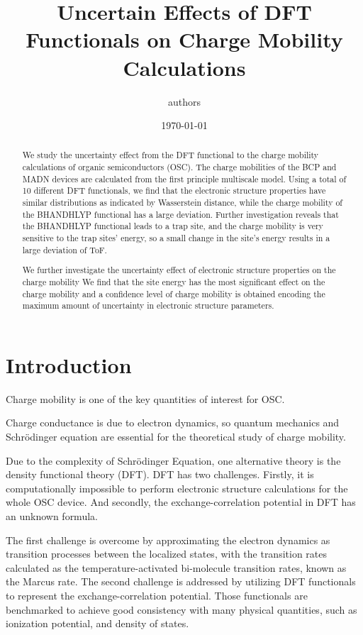\documentclass[letterpaper,12pt]{article}
\begin{document}
\title{Uncertain Effects of DFT Functionals on Charge Mobility Calculations}
\author{authors}
\date{\today}
\maketitle

\begin{abstract}
    We study the uncertainty effect from the DFT functional to the charge mobility calculations of organic semiconductors (OSC). 
    The charge mobilities of the BCP and MADN devices are calculated from the first principle multiscale model. Using a total of 10 different DFT functionals, we find that the electronic structure properties have similar distributions as indicated by Wasserstein distance, while the charge mobility of the BHANDHLYP functional has a large deviation. 
    Further investigation reveals that the BHANDHLYP functional leads to a trap site, and the charge mobility is very sensitive to the trap sites' energy, so a small change in the site's energy results in a large deviation of ToF.  

    We further investigate the uncertainty effect of electronic structure properties on the charge mobility 
    We find that the site energy has the most significant effect on the charge mobility and a confidence level of charge mobility is obtained encoding the maximum amount of uncertainty in electronic structure parameters. 
\end{abstract}

\section{Introduction}
Charge mobility is one of the key quantities of interest for OSC.

Charge conductance is due to electron dynamics, so quantum mechanics and Schr\"odinger equation are essential for the theoretical study of charge mobility. 

Due to the complexity of Schr\"odinger Equation, one alternative theory is the density functional theory (DFT). DFT has two challenges. Firstly, it is computationally impossible to perform electronic structure calculations for the whole OSC device. And secondly, the exchange-correlation potential in DFT has an unknown formula.

The first challenge is overcome by approximating the electron dynamics as transition processes between the localized states, with the transition rates calculated as the temperature-activated bi-molecule transition rates, known as the Marcus rate. 
The second challenge is addressed by utilizing DFT functionals to represent the exchange-correlation potential. 
Those functionals are benchmarked to achieve good consistency with many physical quantities, such as ionization potential, and density of states. 
\end{document}

